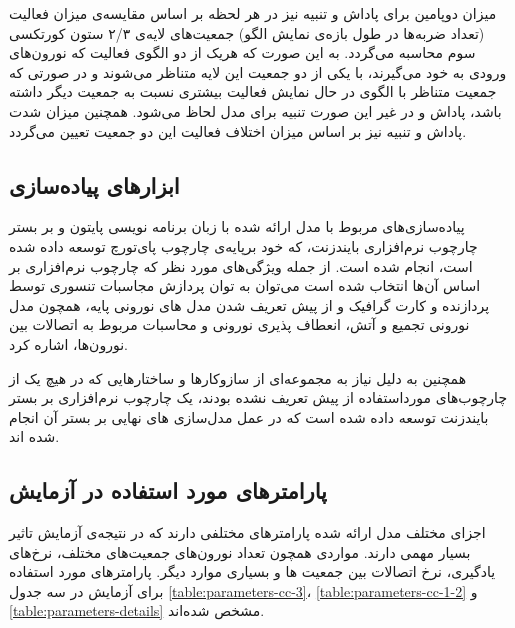 \documentclass[12pt]{report}
\begin{document}
	میزان دوپامین برای پاداش و تنبیه نیز در هر لحظه بر اساس مقایسه‌ی میزان فعالیت (تعداد ضربه‌ها در طول بازه‌ی نمایش الگو) جمعیت‌های لایه‌ی ۲/۳ ستون کورتکسی سوم محاسبه می‌گردد. به این صورت که هریک از دو الگوی فعالیت که نورون‌های ورودی به خود می‌گیرند، با یکی از دو جمعیت این لایه متناظر می‌شوند و در صورتی که جمعیت متناظر با الگوی در حال نمایش فعالیت بیشتری نسبت به جمعیت دیگر داشته باشد، پاداش و در غیر این صورت تنبیه برای مدل لحاظ می‌شود. همچنین میزان شدت پاداش و تنبیه نیز بر اساس میزان اختلاف فعالیت این دو جمعیت تعیین می‌گردد.
	
	

	\subsection{ابزار‌های پیاده‌سازی}
	
	پیاده‌سازی‌های مربوط با مدل ارائه شده با زبان برنامه نویسی پایتون و بر بستر چارچوب نرم‌افزاری بایندزنت، که خود برپایه‌ی چارچوب پای‌تورچ توسعه داده شده است، انجام شده است. از جمله ویژگی‌های مورد نظر که چارچوب نرم‌افزاری بر اساس آن‌ها انتخاب شده است می‌توان به توان پردازش مجاسبات تنسوری توسط پردازنده و کارت گرافیک و از پیش تعریف شدن مدل های نورونی پایه، همچون مدل نورونی تجمیع و آتش، انعطاف پذیری نورونی و محاسبات مربوط به اتصالات بین نورون‌ها، اشاره کرد.
	
	همچنین به دلیل نیاز به مجموعه‌ای از سازوکار‌ها و ساختارهایی که در هیچ یک از چارچوب‌های مورد‌استفاده از پیش تعریف نشده بودند، یک چارچوب نرم‌افزاری بر بستر بایندزنت توسعه داده شده است که در عمل مدل‌سازی های نهایی بر بستر آن انجام شده اند.
	
	\subsection{پارامتر‌های مورد استفاده در آزمایش}
	اجزای مختلف مدل ارائه شده پارامتر‌های مختلفی دارند که در نتیجه‌ی آزمایش تاثیر بسیار مهمی دارند. مواردی همچون تعداد نورون‌های جمعیت‌های مختلف، نرخ‌های یادگیری، نرخ اتصالات بین جمعیت ها و بسیاری موارد دیگر. پارامتر‌های مورد استفاده برای آزمایش در سه جدول \ref{table:parameters-cc-3}، \ref{table:parameters-cc-1-2} و \ref{table:parameters-details} مشخص شده‌اند.
\end{document}

